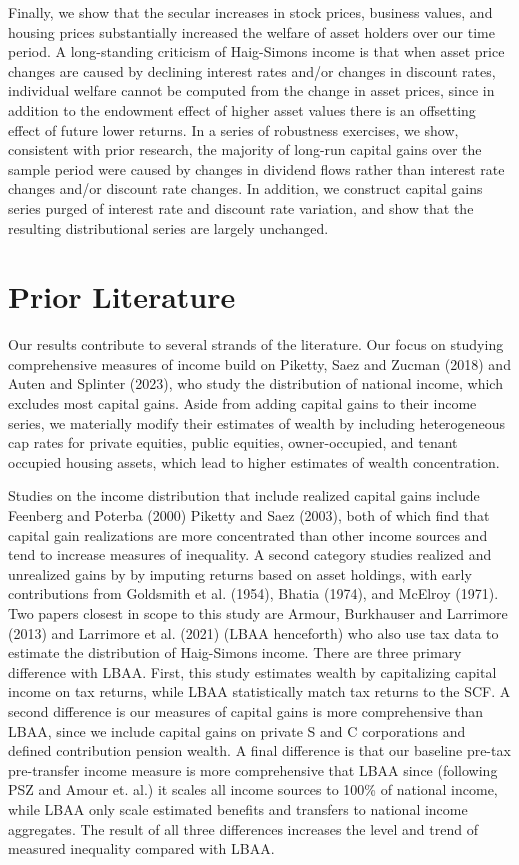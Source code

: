 \documentclass[12pt]{article}
\begin{document}
Finally, we show that the secular increases in stock prices, business values, and housing prices substantially increased the welfare of asset holders over our time period. A long-standing criticism of Haig-Simons income is that when asset price changes are caused by declining interest rates and/or changes in discount rates, individual welfare cannot be computed from the change in asset prices, since in addition to the endowment effect of higher asset values there is an offsetting effect of future lower returns. In a series of robustness exercises, we show, consistent with prior research, the majority of long-run capital gains over the sample period were caused by changes in dividend flows rather than interest rate changes and/or discount rate changes. In addition, we construct capital gains series purged of interest rate and discount rate variation, and show that the resulting distributional series are largely unchanged.

\section{Prior Literature}

Our results contribute to several strands of the literature. Our focus on studying comprehensive measures of income build on Piketty, Saez and Zucman (2018) and Auten and Splinter (2023), who study the distribution of national income, which excludes most capital gains. Aside from adding capital gains to their income series, we materially modify their estimates of wealth by including heterogeneous cap rates for private equities, public equities, owner-occupied, and tenant occupied housing assets, which lead to higher estimates of wealth concentration. 

Studies on the income distribution that include realized capital gains include Feenberg and Poterba (2000) Piketty and Saez (2003), both of which find that capital gain realizations are more concentrated than other income sources and tend to increase measures of inequality. A second category studies realized and unrealized gains by  by imputing returns based on asset holdings, with early contributions from Goldsmith et al. (1954), Bhatia (1974), and McElroy (1971). Two papers closest in scope to this study are Armour, Burkhauser and Larrimore (2013) and Larrimore et al. (2021) (LBAA henceforth) who also use tax data to estimate the distribution of Haig-Simons income. There are three primary difference with LBAA. First, this study estimates wealth by capitalizing capital income on tax returns, while LBAA statistically match tax returns to the SCF. A second difference is our measures of capital gains is more comprehensive than LBAA, since we include capital gains on private S and C corporations and defined contribution pension wealth. A final difference is that our baseline pre-tax pre-transfer income measure is more comprehensive that LBAA since (following PSZ and Amour et. al.) it scales all income sources to 100\% of national income, while LBAA only scale estimated benefits and transfers to national income aggregates. The result of all three differences increases the level and trend of measured inequality compared with LBAA. 
\end{document}
